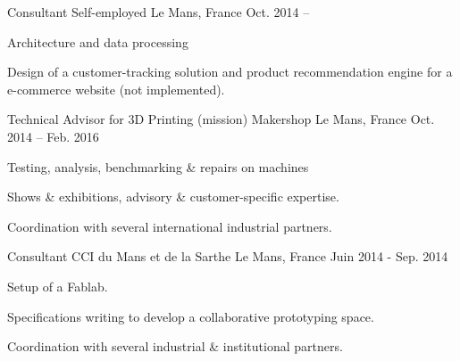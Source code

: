

\begin{cventries}

  \cventry
    {Consultant} %
    {Self-employed} %
    {Le Mans, France} %
    {Oct. 2014 -- } %
    {
      \begin{cvitems} %
				\item {Architecture and data processing}
				\item {Design of a customer-tracking solution and product recommendation engine for a e-commerce website (not implemented).}
      \end{cvitems}
    }

  \cventry
		{Technical Advisor for 3D Printing (mission)} %
    {Makershop} %
    {Le Mans, France} %
    {Oct. 2014 -- Feb. 2016} %
    {
      \begin{cvitems} %
				\item {Testing, analysis, benchmarking \& repairs on machines}
				\item {Shows \& exhibitions, advisory \& customer-specific expertise.}
				\item {Coordination with several international industrial partners.}
      \end{cvitems}
    }

  \cventry
    {Consultant} %
    {CCI du Mans et de la Sarthe} %
    {Le Mans, France} %
    {Juin 2014 - Sep. 2014} %
    {
      \begin{cvitems} %
        \item {Setup of a Fablab.}
				\item {Specifications writing to develop a collaborative prototyping space.}
				\item {Coordination with several industrial \& institutional partners.}
      \end{cvitems}
    }

\end{cventries}
